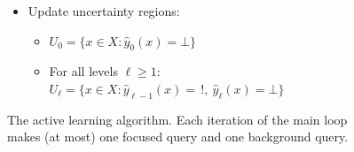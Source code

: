 \documentclass[twoside]{article}
\def\yh{{\widehat{y}}}
\begin{document}
\begin{figure}[h]
{\begin{minipage}[t]{3in}
\begin{itemize}[leftmargin=0.5cm]
\begin{itemize}[leftmargin=0.25cm]
\end{itemize}
\item Update uncertainty regions:
\begin{itemize}[leftmargin=0.25cm]
\item $U_0 = \{x \in X: \yh_0(x) = \bot\}$
\item For all levels $\ell \geq 1$: \ $U_\ell = \{x \in X: \yh_{\ell-1}(x) = \,!, \ \yh_\ell(x) = \bot\}$
\end{itemize}
\end{itemize}

\end{minipage}
}
\caption{The active learning algorithm. Each iteration of the main loop makes (at most) one focused query and one background query.}
\label{alg:main}
\end{figure}

\end{document}
